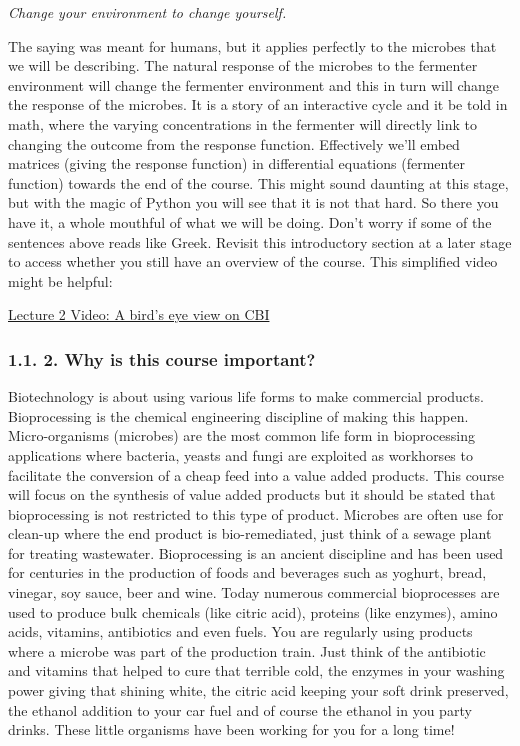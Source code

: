 \documentclass[11pt]{article}
\begin{document}
\emph{Change your environment to change yourself.}

The saying was meant for humans, but it applies perfectly to the
microbes that we will be describing. The natural response of the
microbes to the fermenter environment will change the fermenter
environment and this in turn will change the response of the microbes.
It is a story of an interactive cycle and it be told in math, where the
varying concentrations in the fermenter will directly link to changing
the outcome from the response function. Effectively we'll embed matrices
(giving the response function) in differential equations (fermenter
function) towards the end of the course. This might sound daunting at
this stage, but with the magic of Python you will see that it is not
that hard. So there you have it, a whole mouthful of what we will be
doing. Don't worry if some of the sentences above reads like Greek.
Revisit this introductory section at a later stage to access whether you
still have an overview of the course. This simplified video might be
helpful:

\href{http://www.youtube.com/watch?v=OXe2-Q1R-_I}{Lecture 2 Video: A
bird's eye view on CBI}

\subsubsection{1.1. 2. Why is this course
important?}\label{why-is-this-course-important}

Biotechnology is about using various life forms to make commercial
products. Bioprocessing is the chemical engineering discipline of making
this happen. Micro-organisms (microbes) are the most common life form in
bioprocessing applications where bacteria, yeasts and fungi are
exploited as workhorses to facilitate the conversion of a cheap feed
into a value added products. This course will focus on the synthesis of
value added products but it should be stated that bioprocessing is not
restricted to this type of product. Microbes are often use for clean-up
where the end product is bio-remediated, just think of a sewage plant
for treating wastewater. Bioprocessing is an ancient discipline and has
been used for centuries in the production of foods and beverages such as
yoghurt, bread, vinegar, soy sauce, beer and wine. Today numerous
commercial bioprocesses are used to produce bulk chemicals (like citric
acid), proteins (like enzymes), amino acids, vitamins, antibiotics and
even fuels. You are regularly using products where a microbe was part of
the production train. Just think of the antibiotic and vitamins that
helped to cure that terrible cold, the enzymes in your washing power
giving that shining white, the citric acid keeping your soft drink
preserved, the ethanol addition to your car fuel and of course the
ethanol in you party drinks. These little organisms have been working
for you for a long time!
\end{document}
